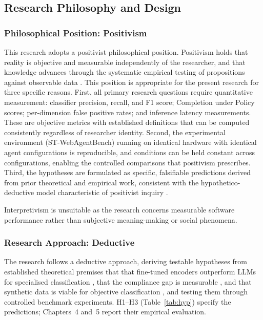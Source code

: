 \documentclass[12pt,a4paper]{article}
\begin{document}
\subsection{Research Philosophy and Design}

\subsubsection{Philosophical Position: Positivism}

This research adopts a positivist philosophical position. Positivism holds that
reality is objective and measurable independently of the researcher, and that
knowledge advances through the systematic empirical testing of propositions against
observable data \citep{saunders2019research,bryman2016social}. This position is
appropriate for the present research for three specific reasons. First, all primary
research questions require quantitative measurement: classifier precision, recall,
and F1 score; Completion under Policy scores; per-dimension false positive rates;
and inference latency measurements. These are objective metrics with established
definitions that can be computed consistently regardless of researcher identity.
Second, the experimental environment (ST-WebAgentBench) running on identical
hardware with identical agent configurations is reproducible, and conditions
can be held constant across configurations, enabling the controlled comparisons
that positivism prescribes. Third, the hypotheses are formulated as specific,
falsifiable predictions derived from prior theoretical and empirical work,
consistent with the hypothetico-deductive model characteristic of positivist
inquiry \citep{bryman2016social}.

Interpretivism is unsuitable as the research concerns measurable software performance rather than subjective meaning-making or social phenomena.

\subsubsection{Research Approach: Deductive}

The research follows a deductive approach, deriving testable hypotheses from
established theoretical premises that that fine-tuned encoders outperform LLMs
for specialised classification \citep{bucher2024finetuned}, that the compliance
gap is measurable \citep{levy2026stwebagentbench}, and that synthetic data is
viable for objective classification \citep{li2023synthetic}, and testing them
through controlled benchmark experiments. H1--H3 (Table~\ref{tab:hyp}) specify
the predictions; Chapters~4 and~5 report their empirical evaluation.
\end{document}

